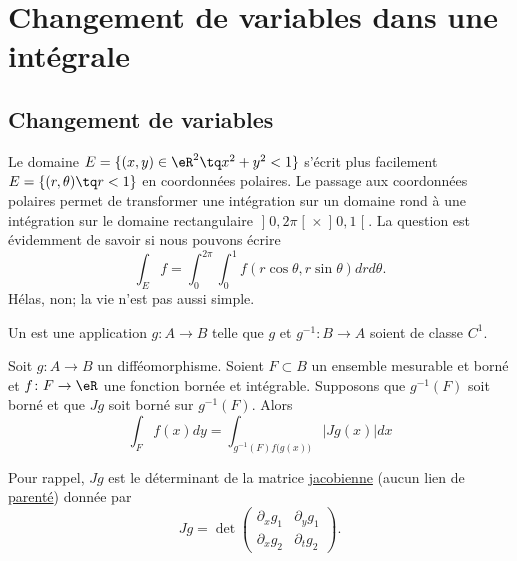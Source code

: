 \section{Changement de variables dans une intégrale}

					\subsection{Changement de variables}

Le domaine $E=\{ (x,y)\in\eR^2\tq x^2+y^2<1 \}$ s'écrit plus facilement $E=\{ (r,\theta)\tq r<1 \}$ en coordonnées polaires. Le passage aux coordonnées polaires permet de transformer une intégration sur un domaine rond à une intégration sur le domaine rectangulaire $\mathopen]0,2\pi\mathclose[\times\mathopen]0,1\mathclose[$. La question est évidemment de savoir si nous pouvons écrire
\begin{equation}
	\int_Ef=\int_{0}^{2\pi}\int_0^1f(r\cos\theta,r\sin\theta)drd\theta.
\end{equation}
Hélas, non; la vie n'est pas aussi simple.

\begin{definition}
    Un  est une application $g\colon A\to B$ telle que $g$ et $g^{-1}\colon B\to A$ soient de classe $C^1$.
\end{definition}

\begin{theorem}
Soit $g\colon A\to B$ un difféomorphisme. Soient $F\subset B$ un ensemble mesurable et borné et $f\colon F\to \eR$ une fonction bornée et intégrable. Supposons que $g^{-1}(F)$ soit borné et que $Jg$ soit borné sur $g^{-1}(F)$. Alors
\begin{equation}
	\int_Ff(x)dy=\int_{g^{-1}(F)f\big( g(x) \big)}| Jg(x) |dx
\end{equation}
\end{theorem}
Pour rappel, $Jg$ est le déterminant de la matrice \href{http://fr.wikipedia.org/wiki/Matrice_jacobienne}{jacobienne} (aucun lien de \href{http://fr.wikipedia.org/wiki/Jacob}{parenté}) donnée par
\begin{equation}
	Jg=\det\begin{pmatrix}
	\partial_xg_1	&	\partial_yg_1	\\
	\partial_xg_2	&	\partial_tg_2
\end{pmatrix}.
\end{equation}

